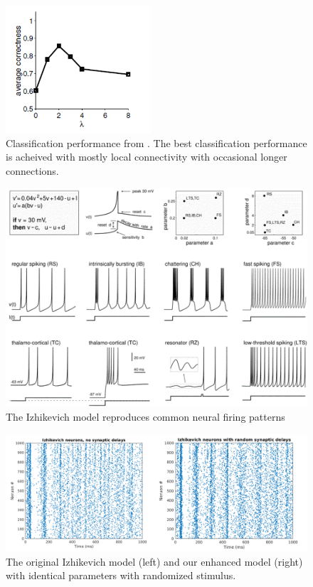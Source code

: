 \documentclass[a4paper,11pt]{article}
\begin{document}
\begin{figure}[p]
  \caption{Classification performance from \cite{maas2002}. The best classification performance is acheived with mostly local connectivity with occasional longer connections.}
  \label{fig:lambda_performance}
  \centering
    \includegraphics[width=0.48\textwidth]{fig/lambda_performance}
\end{figure}

\begin{figure}[p]
 \caption{The Izhikevich model reproduces common neural firing patterns \cite{izhikevich2003}}
 \label{fig:izzy_model}
 \centering
   \includegraphics[width=\textwidth]{fig/izzy_model}
\end{figure}

\begin{figure}[p]
 \caption{The original Izhikevich model (left) and our enhanced model (right) with identical parameters with randomized stimulus.}
 \label{fig:izzy_enhanced}
 \centering
   \includegraphics[width=\textwidth]{fig/izzy_enhanced}
\end{figure}
\end{document}
